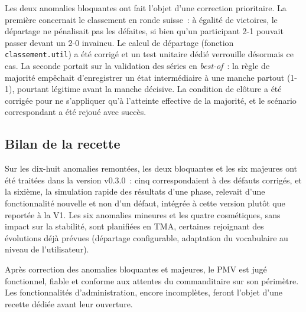 Les deux anomalies bloquantes ont fait l'objet d'une correction prioritaire. La première concernait le classement en ronde suisse~: à égalité de victoires, le départage ne pénalisait pas les défaites, si bien qu'un participant 2-1 pouvait passer devant un 2-0 invaincu. Le calcul de départage (fonction \texttt{classement.util}) a été corrigé et un test unitaire dédié verrouille désormais ce cas. La seconde portait sur la validation des séries en \emph{best-of}~: la règle de majorité empêchait d'enregistrer un état intermédiaire à une manche partout (1-1), pourtant légitime avant la manche décisive. La condition de clôture a été corrigée pour ne s'appliquer qu'à l'atteinte effective de la majorité, et le scénario correspondant a été rejoué avec succès.

\subsection{Bilan de la recette}
Sur les dix-huit anomalies remontées, les deux bloquantes et les six majeures ont été traitées dans la version v0.3.0~: cinq correspondaient à des défauts corrigés, et la sixième, la simulation rapide des résultats d'une phase, relevait d'une fonctionnalité nouvelle et non d'un défaut, intégrée à cette version plutôt que reportée à la V1. Les six anomalies mineures et les quatre cosmétiques, sans impact sur la stabilité, sont planifiées en TMA, certaines rejoignant des évolutions déjà prévues (départage configurable, adaptation du vocabulaire au niveau de l'utilisateur).

Après correction des anomalies bloquantes et majeures, le PMV est jugé fonctionnel, fiable et conforme aux attentes du commanditaire sur son périmètre. Les fonctionnalités d'administration, encore incomplètes, feront l'objet d'une recette dédiée avant leur ouverture.

